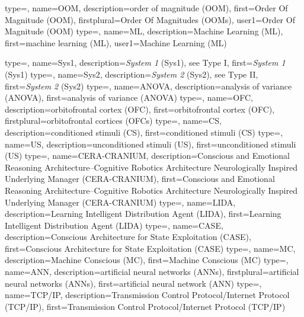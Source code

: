{
  type=\acronymtype,
  name=OOM,
  description={order of magnitude (OOM)},
  first={Order Of Magnitude (OOM)},
  firstplural={Order Of Magnitudes (OOMs)},
  user1={Order Of Magnitude (OOM)}
}
{
  type=\acronymtype,
  name=ML,
  description={Machine Learning (ML)},
  first={machine learning (ML)},
  user1={Machine Learning (ML)}
}

{
  type=\acronymtype,
  name=Sys1,
  description={\emph{System 1} (Sys1), see \gls{Type I}},
  first={\emph{System 1} (Sys1)}
}
{
  type=\acronymtype,
  name=Sys2,
  description={\emph{System 2} (Sys2), see \gls{Type II}},
  first={\emph{System 2} (Sys2)}
}
{
  type=\acronymtype,
  name=ANOVA,
  description={analysis of variance (ANOVA)},
  first={analysis of variance (ANOVA)}
}
{
  type=\acronymtype,
  name=OFC,
  description={orbitofrontal cortex (OFC)},
  first={orbitofrontal cortex (OFC)},
  firstplural={orbitofrontal cortices (OFCs)}
}
{
  type=\acronymtype,
  name=CS,
  description={conditioned stimuli (CS)},
  first={conditioned stimuli (CS)}
}
{
  type=\acronymtype,
  name=US,
  description={unconditioned stimuli (US)},
  first={unconditioned stimuli (US)}
}
{
  type=\acronymtype,
  name=CERA-CRANIUM,
  description={Conscious and Emotional Reasoning Architecture--Cognitive Robotics Architecture Neurologically Inspired Underlying Manager (CERA-CRANIUM)},
  first={Conscious and Emotional Reasoning Architecture--Cognitive Robotics Architecture Neurologically Inspired Underlying Manager (CERA-CRANIUM)}
}
{
  type=\acronymtype,
  name=LIDA,
  description={Learning Intelligent Distribution Agent (LIDA)},
  first={Learning Intelligent Distribution Agent (LIDA)}
}
{
  type=\acronymtype,
  name=CASE,
  description={Conscious Architecture for State Exploitation (CASE)},
  first={Conscious Architecture for State Exploitation (CASE)}
}
{
  type=\acronymtype,
  name=MC,
  description={Machine Conscious (MC)},
  first={Machine Conscious (MC)}
}
{
  type=\acronymtype,
  name=ANN,
  description={artificial neural networks (ANNs)},
  firstplural={artificial neural networks (ANNs)},
  first={artificial neural network (ANN)}
}
{
  type=\acronymtype,
  name=TCP/IP,
  description={Transmission Control Protocol/Internet Protocol (TCP/IP)},
  first={Transmission Control Protocol/Internet Protocol (TCP/IP)}
}
